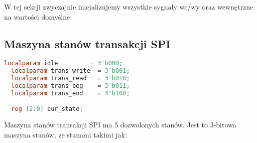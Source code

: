 \documentclass[a4paper,12pt]{article}
\begin{document}
W tej sekcji zwyczajnie inicjalizujemy wszystkie sygnaly we/wy oraz wewnętrzne na wartości domyślne.

\subsection*{Maszyna stanów transakcji SPI}

\begin{lstlisting}[language=verilog]
  localparam idle         = 3'b000;
  localparam trans_write  = 3'b001;
  localparam trans_read   = 3'b010;
  localparam trans_beg    = 3'b011;
  localparam trans_end    = 3'b100;

  reg [2:0] cur_state;
\end{lstlisting}

Maszyna stanów transakcji SPI ma 5 dozwolonych stanów. Jest to 3-bitowa maszyna stanów, ze stanami takimi jak:
\end{document}
